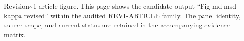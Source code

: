 Revision\textasciitilde{}1 article figure. This page shows the candidate output ``Fig md msd kappa revised'' within the audited REV1-ARTICLE family. The panel identity, source scope, and current status are retained in the accompanying evidence matrix.
